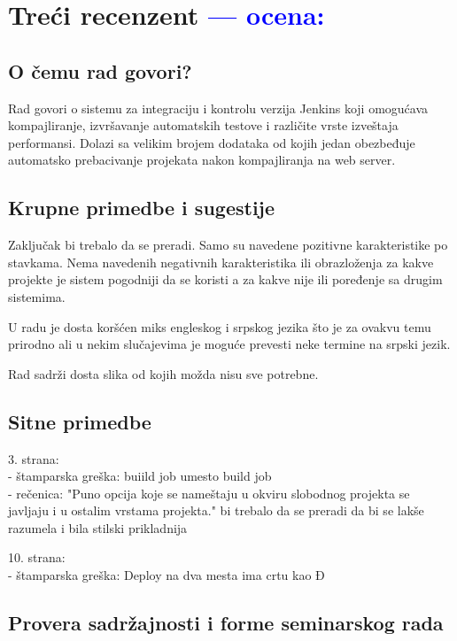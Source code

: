 \documentclass[a4paper]{report}
\newcommand{\odgovor}[1]{\textcolor{blue}{#1}}
\begin{document}
\chapter{Treći recenzent \odgovor{--- ocena:} }
\section{O čemu rad govori?}
Rad govori o sistemu za integraciju i kontrolu verzija Jenkins koji omogućava kompajliranje, izvršavanje automatskih testove i različite vrste izveštaja performansi. Dolazi sa velikim brojem dodataka od kojih jedan obezbeđuje automatsko prebacivanje projekata nakon kompajliranja na web server.

\section{Krupne primedbe i sugestije}
Zaključak bi trebalo da se preradi. Samo su navedene pozitivne karakteristike po stavkama. Nema navedenih negativnih karakteristika ili obrazloženja
za kakve projekte je sistem pogodniji da se koristi a za kakve nije ili poređenje sa drugim sistemima.

U radu je dosta koršćen miks engleskog i srpskog jezika što je za ovakvu temu prirodno ali u nekim slučajevima je moguće prevesti neke 
termine na srpski jezik.

Rad sadrži dosta slika od kojih možda nisu sve potrebne. 
\section{Sitne primedbe}
3. strana:\\
- štamparska greška: buiild job umesto build job\\
- rečenica: "Puno opcija koje se nameštaju u okviru slobodnog projekta se javljaju i u ostalim vrstama projekta." bi trebalo da se preradi
da bi se lakše razumela i bila stilski prikladnija

10. strana:\\
- štamparska greška: Deploy na dva mesta ima crtu kao Đ
 

\section{Provera sadržajnosti i forme seminarskog rada}
\end{document}
